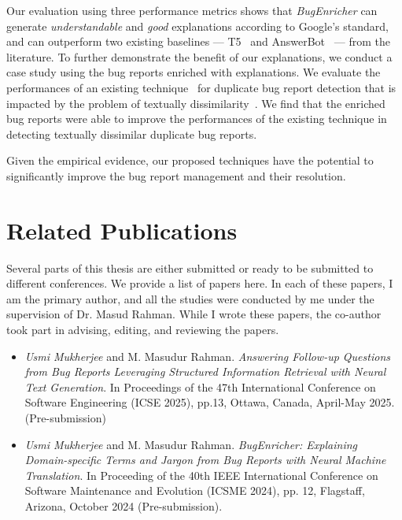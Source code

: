 Our evaluation using three performance metrics shows that \textit{BugEnricher} can generate \textit{understandable} and \textit{good} explanations according to Google’s standard, and can outperform two existing baselines --- T5~\cite{raffel2020exploring} and AnswerBot~\cite{xu2017answerbot} --- from the literature. To further demonstrate the benefit of our explanations, we conduct a case study using the bug reports enriched with explanations. We evaluate the performances of an existing technique~\cite{yang2012duplication} for duplicate bug report detection that is impacted by the problem of textually dissimilarity~\cite{jahan2023towards}. We find that the enriched bug reports were able to improve the performances of the existing technique in detecting textually dissimilar duplicate bug reports.\par

Given the empirical evidence, our proposed techniques have the potential to significantly improve the bug report management and their resolution.

\section{Related Publications}
Several parts of this thesis are either submitted or ready to be submitted to different conferences.
We provide a list of papers here. In each of these papers, I am the primary author, and all the studies were conducted by me under the supervision of Dr. Masud Rahman. While I wrote these papers, the co-author took part in advising, editing, and reviewing the papers.
\begin{itemize}
    \item \emph{Usmi Mukherjee} and M. Masudur Rahman. \emph{Answering Follow-up Questions from Bug Reports Leveraging Structured Information Retrieval with Neural Text Generation}. In Proceedings of the 47th International Conference on Software Engineering (ICSE 2025), pp.13, Ottawa, Canada, April-May 2025.(Pre-submission)
\end{itemize}

\begin{itemize}
    \item \emph{Usmi Mukherjee} and M. Masudur Rahman. \emph{BugEnricher: Explaining Domain-specific Terms and Jargon from Bug Reports with Neural Machine Translation}. In Proceeding of the 40th IEEE International Conference on Software Maintenance and Evolution (ICSME 2024), pp. 12, Flagstaff, Arizona, October 2024 (Pre-submission).
\end{itemize}

